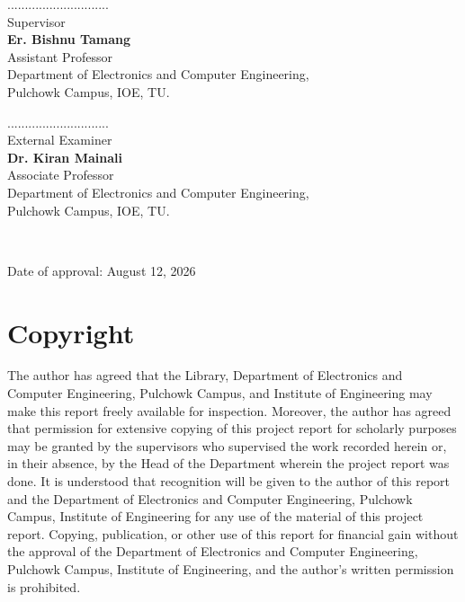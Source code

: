 \documentclass[12pt]{report}
\begin{document}
\vspace{1.5cm}
\begin{minipage}{.5\textwidth}
  \raggedright
  .............................\\
  Supervisor\\
  \textbf{Er. Bishnu Tamang}\\
  Assistant Professor\\
  Department of Electronics and Computer Engineering,\\
  Pulchowk Campus, IOE, TU.\\
\end{minipage}%
\begin{minipage}{0.5\textwidth}
  \raggedleft
  .............................\\
  External Examiner\\
  \textbf{Dr. Kiran Mainali}\\
  Associate Professor\\
  Department of Electronics and Computer Engineering,\\
  Pulchowk Campus, IOE, TU.\\
\end{minipage}\\
\newline\newline\newline
\centerline{Date of approval: August 12, 2026}

\chapter*{Copyright}
The author has agreed that the Library, Department of Electronics and Computer Engineering, Pulchowk Campus, and Institute of Engineering may make this report freely available for inspection. Moreover, the author has agreed that permission for extensive copying of this project report for scholarly purposes may be granted by the supervisors who supervised the work recorded herein or, in their absence, by the Head of the Department wherein the project report was done. It is understood that recognition will be given to the author of this report and the Department of Electronics and Computer Engineering, Pulchowk Campus, Institute of Engineering for any use of the material of this project report. Copying, publication, or other use of this report for financial gain without the approval of the Department of Electronics and Computer Engineering, Pulchowk Campus, Institute of Engineering, and the author's written permission is prohibited.\\
\end{document}
